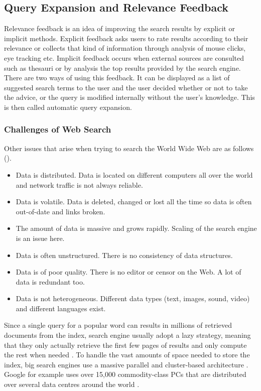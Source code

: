 \subsection{Query Expansion and Relevance Feedback}
\label{s:qexpansion}

Relevance feedback is an idea of improving the search results by explicit or implicit methods. Explicit feedback asks users to rate results according to their relevance or collects that kind of information through analysis of mouse clicks, eye tracking etc. Implicit feedback occurs when external sources are consulted such as thesauri or by analysis the top results provided by the search engine. There are two ways of using this feedback. It can be displayed as a list of suggested search terms to the user and the user decided whether or not to take the advice, or the query is modified internally without the user's knowledge. This is then called automatic query expansion.


\subsubsection*{Challenges of Web Search}

Other issues that arise when trying to search the World Wide Web are as follows (\autocite[p.449]{Baeza-Yates2011}).

\begin{itemize}
  \item Data is distributed. Data is located on different computers all over the world and network traffic is not always reliable.
  \item Data is volatile. Data is deleted, changed or lost all the time so data is often out-of-date and links broken.
  \item The amount of data is massive and grows rapidly. Scaling of the search engine is an issue here.
  \item Data is often unstructured. There is no consistency of data structures.
  \item Data is of poor quality. There is no editor or censor on the Web. A lot of data is redundant too.
  \item Data is not heterogeneous. Different data types (text, images, sound, video) and different languages exist.
\end{itemize}

Since a single query for a popular word can results in  millions of retrieved documents from the index, search engine usually adopt a lazy strategy, meaning that they only actually retrieve the first few pages of results and only compute the rest when needed \autocite[p.459]{Baeza-Yates2011}. To handle the vast amounts of space needed to store the index, big search engines use a massive parallel and cluster-based architecture \autocite[p.459]{Baeza-Yates2011}. Google for example uses over 15,000 commodity-class PCs that are distributed over several data centres around the world \autocite{Dean2003}.


